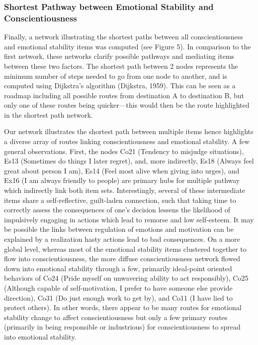\documentclass[man]{apa6}
\begin{document}
\subsubsection{Shortest Pathway between Emotional Stability and
Conscientiousness}\label{shortest-pathway-between-emotional-stability-and-conscientiousness}

Finally, a network illustrating the shortest paths between all
conscientiousness and emotional stability items was computed (see Figure
5). In comparison to the first network, these networks clarify possible
pathways and mediating items between these two factors. The shortest
path between 2 nodes represents the minimum number of steps needed to go
from one node to another, and is computed using Dijkstra's algorithm
(Dijkstra, 1959). This can be seen as a roadmap including all possible
routes from destination A to destination B, but only one of these routes
being quicker---this would then be the route highlighted in the shortest
path network.

Our network illustrates the shortest path between multiple items hence
highlights a diverse array of routes linking conscientiousness and
emotional stability. A few general observations. First, the nodes Co21
(Tendency to misjudge situations), Es13 (Sometimes do things I later
regret), and, more indirectly, Es18 (Always feel great about person I
am), Es14 (Feel most alive when giving into urges), and Ex16 (I am
always friendly to people) are primary hubs for multiple pathway which
indirectly link both item sets. Interestingly, several of these
intermediate items share a self-reflective, guilt-laden connection, such
that taking time to correctly assess the consequences of one's decision
lessens the likelihood of impulsively engaging in actions which lead to
remorse and low self-esteem. It may be possible the links between
regulation of emotions and motivation can be explained by a realization
hasty actions lead to bad consequences. On a more global level, whereas
most of the emotional stability items clustered together to flow into
conscientiousness, the more diffuse conscientiousness network flowed
down into emotional stability through a few, primarily ideal-point
oriented behaviors of Co24 (Pride myself on unwavering ability to act
responsibly), Co25 (Although capable of self-motivation, I prefer to
have someone else provide direction), Co31 (Do just enough work to get
by), and Co11 (I have lied to protect others). In other words, there
appear to be many routes for emotional stability change to affect
conscientiousness but only a few primary routes (primarily in being
responsible or industrious) for conscientiousness to spread into
emotional stability.
\end{document}
